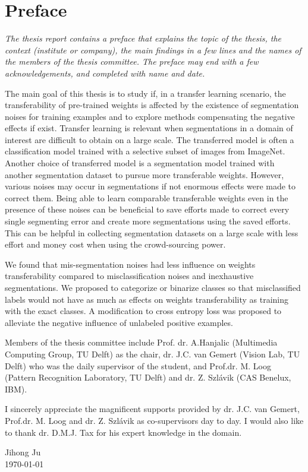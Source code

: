 \section{Preface}
\label{sec:preface}

\noindent \textit{The thesis report contains a preface that explains the topic of the thesis, the context (institute or company), the main findings in a few lines and the names of the members of the thesis committee. The preface may end with a few acknowledgements, and completed with name and date.}

The main goal of this thesis is to study if, in a transfer learning scenario, the transferability of pre-trained weights is affected by the existence of segmentation noises for training examples and to explore methods compensating the negative effects if exist.
Transfer learning is relevant when segmentations in a domain of interest are difficult to obtain on a large scale.
The transferred model is often a classification model trained with a selective subset of images from ImageNet.
Another choice of transferred model is a segmentation model trained with another segmentation dataset to pursue more transferable weights.
However, various noises may occur in segmentations if not enormous effects were made to correct them.
Being able to learn comparable transferable weights even in the presence of these noises can be beneficial to save efforts made to correct every single segmenting error and create more segmentations using the saved efforts.
This can be helpful in collecting segmentation datasets on a large scale with less effort and money cost when using the crowd-sourcing power.

We found that mis-segmentation noises had less influence on weights transferability compared to misclassification noises and inexhaustive segmentations.
We proposed to categorize or binarize classes so that misclassified labels would not have as much as effects on weights transferability as training with the exact classes.
A modification to cross entropy loss was proposed to alleviate the negative influence of unlabeled positive examples.

Members of the thesis committee include Prof. dr. A.Hanjalic (Multimedia Computing Group, TU Delft) as the chair, dr. J.C. van Gemert (Vision Lab, TU Delft) who was the daily supervisor of the student, and Prof.dr. M. Loog  (Pattern Recognition Laboratory, TU Delft) and dr. Z. Szlávik (CAS Benelux, IBM).

I sincerely appreciate the magnificent supports provided by dr. J.C. van Gemert, Prof.dr. M. Loog and dr. Z. Szlávik as co-supervisors day to day.
I would also like to thank dr. D.M.J. Tax for his expert knowledge in the domain.

\begin{flushright}
Jihong Ju\\
\today
\end{flushright}
